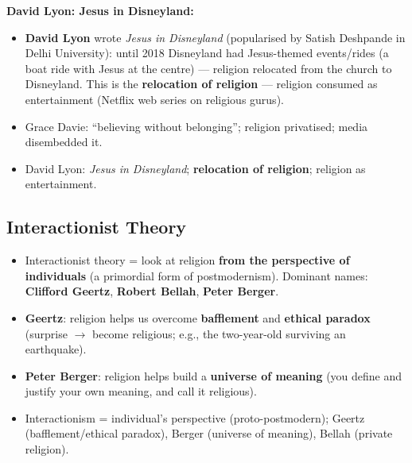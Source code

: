 \begin{DataFact}
\textbf{David Lyon: Jesus in Disneyland:}
\begin{itemize}
\item \textbf{David Lyon} wrote \textit{Jesus in Disneyland} (popularised by Satish Deshpande in Delhi University): until 2018 Disneyland had Jesus-themed events/rides (a boat ride with Jesus at the centre) --- religion relocated from the church to Disneyland. This is the \textbf{relocation of religion} --- religion consumed as entertainment (Netflix web series on religious gurus).
\end{itemize}
\end{DataFact}

\begin{QuickRevision}
\begin{itemize}
\item Grace Davie: ``believing without belonging''; religion privatised; media disembedded it.
\item David Lyon: \textit{Jesus in Disneyland}; \textbf{relocation of religion}; religion as entertainment.
\end{itemize}
\end{QuickRevision}

\sectiondivider

\subsection{Interactionist Theory}

\begin{KeyConcept}
\begin{itemize}
\item Interactionist theory = look at religion \textbf{from the perspective of individuals} (a primordial form of postmodernism). Dominant names: \textbf{Clifford Geertz}, \textbf{Robert Bellah}, \textbf{Peter Berger}.
\item \textbf{Geertz}: religion helps us overcome \textbf{bafflement} and \textbf{ethical paradox} (surprise $\rightarrow$ become religious; e.g., the two-year-old surviving an earthquake).
\item \textbf{Peter Berger}: religion helps build a \textbf{universe of meaning} (you define and justify your own meaning, and call it religious).
\end{itemize}
\end{KeyConcept}

\begin{QuickRevision}
\begin{itemize}
\item Interactionism = individual's perspective (proto-postmodern); Geertz (bafflement/ethical paradox), Berger (universe of meaning), Bellah (private religion).
\end{itemize}
\end{QuickRevision}

